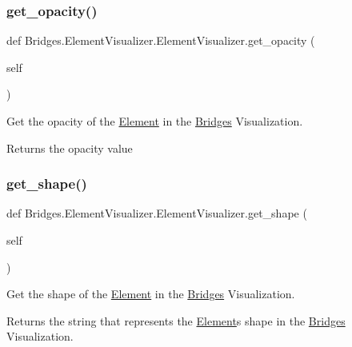 \subsubsection{\texorpdfstring{get\+\_\+opacity()}{get\_opacity()}}
{\footnotesize\ttfamily def Bridges.\+Element\+Visualizer.\+Element\+Visualizer.\+get\+\_\+opacity (\begin{DoxyParamCaption}\item[{}]{self }\end{DoxyParamCaption})}



Get the opacity of the \mbox{\hyperlink{namespace_bridges_1_1_element}{Element}} in the \mbox{\hyperlink{namespace_bridges_1_1_bridges}{Bridges}} Visualization. 

\begin{DoxyReturn}{Returns}
the opacity value 
\end{DoxyReturn}
\mbox{\label{class_bridges_1_1_element_visualizer_1_1_element_visualizer_aa1fe7978af156f5a2a2cad15eda02287}} 
\subsubsection{\texorpdfstring{get\+\_\+shape()}{get\_shape()}}
{\footnotesize\ttfamily def Bridges.\+Element\+Visualizer.\+Element\+Visualizer.\+get\+\_\+shape (\begin{DoxyParamCaption}\item[{}]{self }\end{DoxyParamCaption})}



Get the shape of the \mbox{\hyperlink{namespace_bridges_1_1_element}{Element}} in the \mbox{\hyperlink{namespace_bridges_1_1_bridges}{Bridges}} Visualization. 

\begin{DoxyReturn}{Returns}
the string that represents the \mbox{\hyperlink{namespace_bridges_1_1_element}{Element}}\textquotesingle{}s shape in the \mbox{\hyperlink{namespace_bridges_1_1_bridges}{Bridges}} Visualization. 
\end{DoxyReturn}
\mbox{\label{class_bridges_1_1_element_visualizer_1_1_element_visualizer_a12bbfd402a0e05e625d36f0ef5a3bcef}} 
